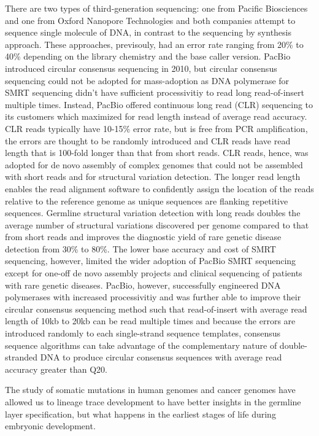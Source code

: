 There are two types of third-generation sequencing: one from Pacific Biosciences and one from Oxford Nanopore Technologies and both companies attempt to sequence single molecule of DNA, in contrast to the sequencing by synthesis approach. These approaches, previsouly, had an error rate ranging from 20\% to 40\% depending on the library chemistry and the base caller version. PacBio introduced circular consensus sequencing in 2010, but circular consensus sequencing could not be adopted for mass-adoption as DNA polymerase for SMRT sequencing didn't have sufficient processivitiy to read long read-of-insert multiple times. Instead, PacBio offered continuous long read (CLR) sequencing to its customers which maximized for read length instead of average read accuracy. CLR reads typically have 10-15\% error rate, but is free from PCR amplification, the errors are thought to be randomly introduced and CLR reads have read length that is 100-fold longer than that from short reads. CLR reads, hence, was adopted for de novo assembly of complex genomes that could not be assembled with short reads and for structural variation detection. The longer read length enables the read alignment software to confidently assign the location of the reads relative to the reference genome as unique sequences are flanking repetitive sequences. Germline structural variation detection with long reads doubles the average number of structural variations discovered per genome compared to that from short reads and improves the diagnostic yield of rare genetic disease detection from 30\% to 80\%. The lower base accuracy and cost of SMRT sequencing, however, limited the wider adoption of PacBio SMRT sequencing except for one-off de novo assembly projects and clinical sequencing of patients with rare genetic diseases. PacBio, however, successfully engineered DNA polymerases with increased processivitiy and was further able to improve their circular consensus sequencing method such that read-of-insert with average read length of 10kb to 20kb can be read multiple times and because the errors are introduced randomly to each single-strand sequence templates, consensus sequence algorithms can take advantage of the complementary nature of double-stranded DNA to produce circular consensus sequences with average read accuracy greater than Q20.  

The study of somatic mutations in human genomes and cancer genomes have allowed us to lineage trace development to have better insights in the germline layer specification, but what happens in the earliest stages of life during embryonic development.      

